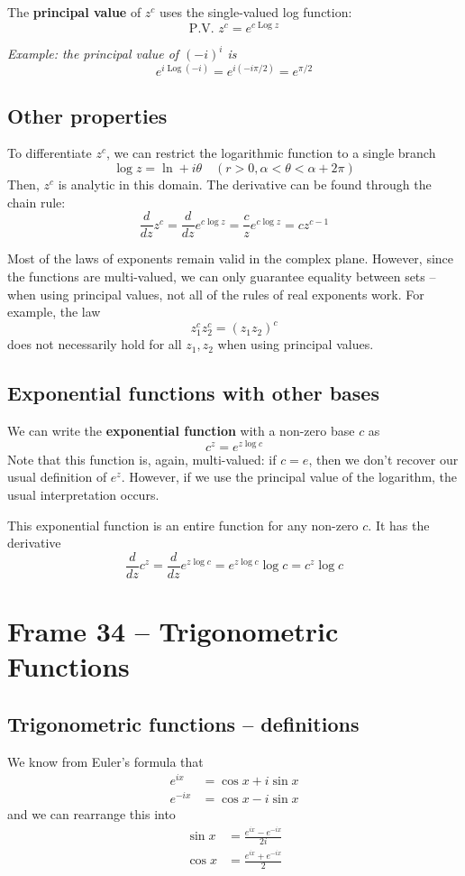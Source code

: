 \documentclass{article}
\renewcommand{\emph}{\textbf}
\DeclareMathOperator{\Log}{Log}
\begin{document}
The \emph{principal value} of $z^c$ uses the single-valued log function:
\[
	\text{P.V. } z^c = e^{c \Log z}
\]

\textit{Example: the principal value of $(-i)^i$ is
\[
	e^{i \Log(-i)}
	= e^{i(-i \pi/2)}
	= e^{\pi / 2}
\]}

\subsection{Other properties}
To differentiate $z^c$, we can restrict the logarithmic function to a single branch
\[
	\log z = \ln + i\theta	\quad (r > 0, \alpha < \theta < \alpha + 2\pi)
\]
Then, $z^c$ is analytic in this domain. The derivative can be found through the chain rule:
\[
	\frac{d}{dz} z^c
	= \frac{d}{dz} e^{c \log z}
	= \frac{c}{z} e^{c \log z}
	= c z^{c-1}
\]

Most of the laws of exponents remain valid in the complex plane. However, since the functions are multi-valued, we can only guarantee equality between sets -- when using principal values, not all of the rules of real exponents work. For example, the law
\[
	z_1^c z_2^c = (z_1 z_2)^c
\]
does not necessarily hold for all $z_1, z_2$ when using principal values.

\subsection{Exponential functions with other bases}
We can write the \emph{exponential function} with a non-zero base $c$ as
\[
	c^z = e^{z \log c}
\]
Note that this function is, again, multi-valued: if $c = e$, then we don't recover our usual definition of $e^z$. However, if we use the principal value of the logarithm, the usual interpretation occurs.

This exponential function is an entire function for any non-zero $c$. It has the derivative
\[
	\frac{d}{dz} c^z 
	= \frac{d}{dz} e^{z \log c}
	= e^{z \log c} \log c
	= c^z \log c
\]


\clearpage
\section{Frame 34 -- Trigonometric Functions}
\subsection{Trigonometric functions -- definitions}
We know from Euler's formula that
\begin{align*}
	e^{ix}  &= \cos x + i \sin x \\
	e^{-ix} &= \cos x - i \sin x
\end{align*}
and we can rearrange this into
\begin{align*}
	\sin x &= \frac{e^{ix} - e^{-ix}}{2i} \\
	\cos x &= \frac{e^{ix} + e^{-ix}}{2 }
\end{align*}
\end{document}
